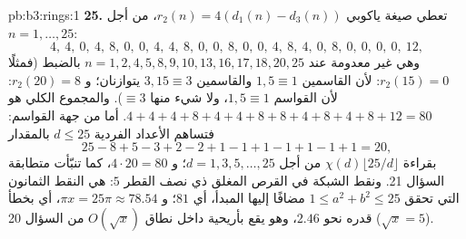 \begin{solution}{pb:b3:rings:1}
\textbf{25.} تعطي صيغة ياكوبي $r_2(n) = 4(d_1(n) - d_3(n))$، من أجل $n = 1, \dots, 25$:
\[
4,\ 4,\ 0,\ 4,\ 8,\ 0,\ 0,\ 4,\ 4,\ 8,\ 0,\ 0,\ 8,\ 0,\ 0,\
4,\ 8,\ 4,\ 0,\ 8,\ 0,\ 0,\ 0,\ 0,\ 12,
\]
وهي غير معدومة عند $n = 1, 2, 4, 5, 8, 9, 10, 13, 16, 17, 18,
20, 25$ بالضبط (فمثلًا $r_2(15) = 0$:
لأن القاسمين $1, 5 \equiv 1$ والقاسمين $3, 15 \equiv 3$
يتوازنان؛ و $r_2(20) = 8$: لأن القواسم $1, 5
\equiv 1$، ولا شيء منها
$\equiv 3$). والمجموع الكلي هو $4 + 4 + 4 + 8 + 4 +
4 + 8 + 8 + 4 + 8 + 4 + 8 + 12 = 80$. أما من جهة القواسم:
فتساهم الأعداد الفردية $d \leq 25$ بالمقدار
\[
25 - 8 + 5 - 3 + 2 - 2 + 1 - 1 + 1 - 1 + 1 - 1 + 1 = 20,
\]
بقراءة $\chi(d)\lfloor 25/d\rfloor$ من أجل $d = 1, 3, 5, \dots,
25$؛ و $4 \cdot 20 = 80$، كما تنبّأت متطابقة
السؤال 21. ونقط الشبكة في القرص المغلق ذي نصف القطر $5$: هي
النقط الثمانون التي تحقق $1 \leq a^2 + b^2 \leq 25$ مضافًا إليها المبدأ، أي $81$؛
و $\pi x = 25\pi \approx 78.54$، أي بخطأ قدره نحو $2.46$، وهو يقع بأريحية داخل نطاق
$O(\sqrt x)$ من السؤال 20 ($\sqrt x = 5$).
\end{solution}
